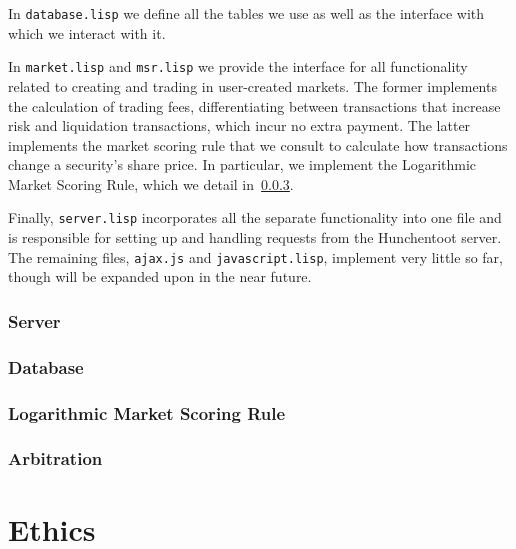 \documentclass[10pt,a4paper]{article}
\theoremstyle{plain}
\theoremstyle{definition}
\newcommand{\code}[1]{\texttt{#1}}
\begin{document}
In \code{database.lisp} we define all the tables we use as well as the
interface with which we interact with it.

In \code{market.lisp} and \code{msr.lisp} we provide the interface for all
functionality related to creating and trading in user-created markets. The
former implements the calculation of trading fees, differentiating between
transactions that increase risk and liquidation transactions, which incur no
extra payment. The latter implements the market scoring rule that we consult to
calculate how transactions change a security's share price. In particular, we
implement the Logarithmic Market Scoring Rule, which we detail
in~\ref{sec:LMSR}.

Finally, \code{server.lisp} incorporates all the separate functionality into
one file and is responsible for setting up and handling requests from the
Hunchentoot server. The remaining files, \code{ajax.js} and
\code{javascript.lisp}, implement very little so far, though will be expanded
upon in the near future.

\subsubsection{Server}

\subsubsection{Database}

\subsubsection{Logarithmic Market Scoring Rule}

\label{sec:LMSR}

\subsubsection{Arbitration}





\section{Ethics}
\end{document}
